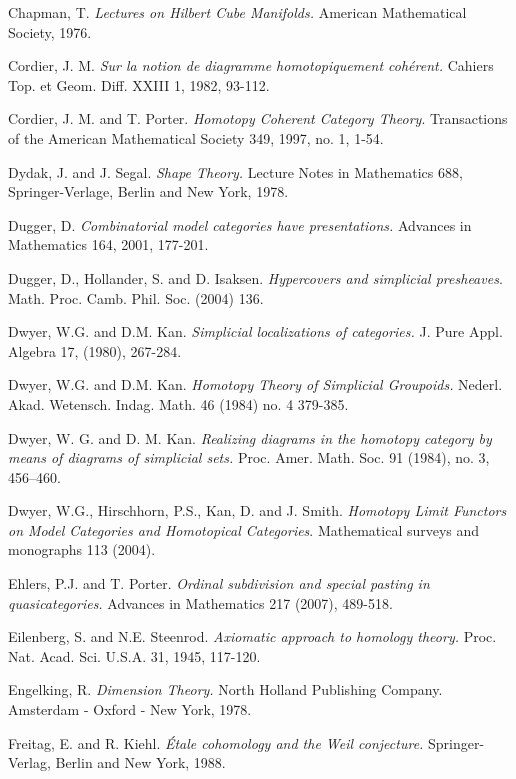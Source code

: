 \documentclass[12pt, final]{report}
\theoremstyle{definition}
\begin{document}
\begin{thebibliography}{99}
 Chapman, T. {\it Lectures on Hilbert Cube Manifolds.} American Mathematical Society, 1976.

 Cordier, J. M. {\it Sur la notion de diagramme homotopiquement coh\'{e}rent.} Cahiers Top. et Geom. Diff. XXIII 1, 1982, 93-112.

 Cordier, J. M. and T. Porter.
{\it Homotopy Coherent Category Theory}. Transactions of the American
Mathematical Society 349, 1997, no. 1, 1-54.

 Dydak, J. and J. Segal. {\it Shape Theory.} Lecture Notes in Mathematics 688, Springer-Verlage, Berlin and New York, 1978.

 Dugger, D. {\it Combinatorial model categories have presentations.} Advances in Mathematics 164, 2001, 177-201.

 Dugger, D., Hollander, S. and D. Isaksen. {\it
Hypercovers and simplicial presheaves}. Math. Proc. Camb. Phil. Soc. (2004) 136. 

 Dwyer, W.G. and D.M. Kan. {\it Simplicial localizations
of categories.} J. Pure Appl. Algebra 17, (1980), 267-284.

 Dwyer, W.G. and D.M. Kan. {\it Homotopy Theory of
Simplicial Groupoids.} Nederl. Akad. Wetensch. Indag. Math. 46
(1984) no. 4 379-385.

 Dwyer, W. G. and D. M. Kan. {\it Realizing diagrams in the homotopy category by means of diagrams of simplicial sets.} Proc. Amer. Math. Soc. 91 (1984), no. 3, 456--460.

 Dwyer, W.G., Hirschhorn, P.S., Kan, D. and J. Smith. {\it Homotopy Limit Functors on Model Categories and Homotopical Categories}. Mathematical surveys and monographs 113 (2004).

 Ehlers, P.J. and T. Porter. {\it Ordinal subdivision and special pasting in quasicategories.} Advances in Mathematics 217 (2007), 489-518.

 Eilenberg, S. and N.E. Steenrod. {\it Axiomatic approach to homology theory.} Proc. Nat. Acad. Sci. U.S.A. 31, 1945, 117-120.

 Engelking, R. {\it Dimension Theory.} North Holland Publishing Company. Amsterdam - Oxford - New York, 1978. 

 Freitag, E. and R. Kiehl. {\it \'{E}tale cohomology and the Weil conjecture.} Springer-Verlag, Berlin and New York, 1988.


\end{thebibliography}
\end{document}
